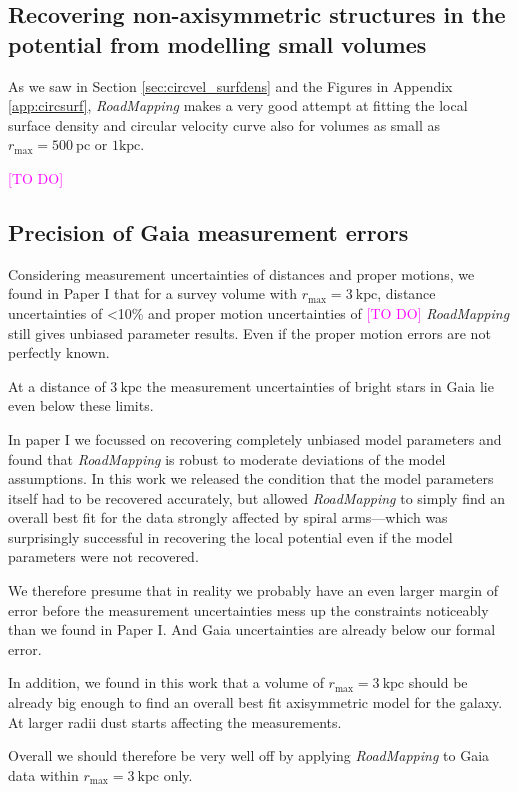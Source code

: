 \documentclass[iop,revtex4,numberedappendix,appendixfloats]{emulateapj}
\newcommand{\RM}{{\sl RoadMapping}}
\newcommand{\Wilma}[1]{\textcolor{Magenta}{#1}}
\begin{document}
\subsection{Recovering non-axisymmetric structures in the potential from modelling small volumes}

As we saw in Section \ref{sec:circvel_surfdens} and the Figures in Appendix \ref{app:circsurf}, \RM{} makes a very good attempt at fitting the local surface density and circular velocity curve also for volumes as small as $r_\text{max}=500~\text{pc}$ or $1\text{kpc}$. 


\Wilma{[TO DO]}


\subsection{Precision of Gaia measurement errors}

Considering measurement uncertainties of distances and proper motions, we found in Paper I that for a survey volume with $r_\text{max} = 3~\text{kpc}$, distance uncertainties of <10\% and proper motion uncertainties of \Wilma{[TO DO]} \RM{} still gives unbiased parameter results. Even if the proper motion errors are not perfectly known. 

At a distance of $3~\text{kpc}$ the measurement uncertainties of bright stars in Gaia lie even below these limits. 

In paper I we focussed on recovering completely unbiased model parameters and found that \RM{} is robust to moderate deviations of the model assumptions. In this work we released the condition that the model parameters itself had to be recovered accurately, but allowed \RM{} to simply find an overall best fit for the data strongly affected by spiral arms---which was surprisingly successful in recovering the local potential even if the model parameters were not recovered. 

We therefore presume that in reality we probably have an even larger margin of error before the measurement uncertainties mess up the constraints noticeably than we found in Paper I. And Gaia uncertainties are already below our formal error.

In addition, we found in this work that a volume of $r_\text{max} = 3~\text{kpc}$ should be already big enough to find an overall best fit axisymmetric model for the galaxy. At larger radii dust starts affecting the measurements.

Overall we should therefore be very well off by applying \RM{} to Gaia data within $r_\text{max}=3~\text{kpc}$ only.
\end{document}
